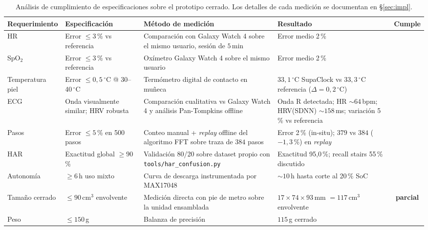 \documentclass[letterpaper,11pt]{article}
\renewcommand{\checkmark}{\ding{51}}
\newcommand{\alertsym}[1]{\textcolor{orange!85!black}{\textbf{#1}}}
\begin{document}
\begin{table}[H]
    \centering
    \caption{An\'alisis de cumplimiento de especificaciones sobre el prototipo cerrado. Los detalles de cada medici\'on se documentan en \S\ref{sec:impl}.}
    \label{tab:cumplimiento}
    \footnotesize
    \renewcommand{\arraystretch}{1.05}
    \begin{tabular}{|L{2.7cm}|L{3.6cm}|L{3.2cm}|L{4.2cm}|c|}\hline
    \textbf{Requerimiento} & \textbf{Especificaci\'on} & \textbf{M\'etodo de medici\'on} & \textbf{Resultado} & \textbf{Cumple} \\\hline
    HR & Error $\leq 3$\,\% vs referencia & Comparaci\'on con Galaxy Watch 4 \cite{galaxy_watch4} sobre el mismo usuario, sesi\'on de $5$\,min & Error medio 2\,\% & \checkmark \\\hline
    SpO$_2$ & Error $\leq 3$\,\% vs referencia & Ox\'imetro Galaxy Watch 4 \cite{galaxy_watch4} sobre el mismo usuario & Error medio 2\,\% & \checkmark \\\hline
    Temperatura piel & Error $\leq 0{,}5\,^\circ$C @ 30--40\,$^\circ$C & Term\'ometro digital de contacto en mu\~neca & $33{,}1\,^\circ$C SupaClock vs $33{,}3\,^\circ$C referencia ($\Delta=0{,}2\,^\circ$C) & \checkmark \\\hline
    ECG & Onda visualmente similar; HRV robusta & Comparaci\'on cualitativa vs Galaxy Watch 4 y an\'alisis Pan-Tompkins offline & Onda R detectada; HR $\sim 64$\,bpm; HRV(SDNN) $\sim 158$\,ms; variaci\'on 5\,\% vs referencia & \checkmark \\\hline
    Pasos & Error $\leq 5$\,\% en 500 pasos & Conteo manual + \textit{replay} offline del algoritmo FFT sobre traza de $384$ pasos & Error 2\,\% (in-situ); $379$ vs $384$ ($-1{,}3$\,\%) en \textit{replay} & \checkmark \\\hline
    HAR & Exactitud global $\geq 90$\,\% & Validaci\'on 80/20 sobre dataset propio con \texttt{tools/har\_confusion.py} & Exactitud 95{,}0\,\%; recall stairs 55\,\% discutido & \checkmark \\\hline
    Autonom\'ia & $\geq 6$\,h uso mixto & Curva de descarga instrumentada por MAX17048 & $\sim 10$\,h hasta corte al 20\,\% SoC & \checkmark \\\hline
    Tama\~no cerrado & $\leq 90$\,cm$^3$ envolvente & Medici\'on directa con pie de metro sobre la unidad ensamblada & $17\times 74\times 93$\,mm $=117$\,cm$^3$ envolvente & \alertsym{parcial} \\\hline
    Peso & $\leq 150$\,g & Balanza de precisi\'on & $115$\,g cerrado & \checkmark \\\hline

\end{tabular}
\end{table}
\end{document}
